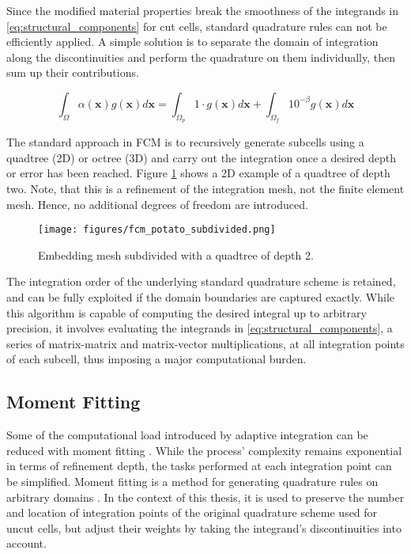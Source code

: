 Since the modified material properties break the smoothness of the integrands in \ref{eq:structural_components} for cut cells, standard quadrature rules can not be efficiently applied. A simple solution is to separate the domain of integration along the discontinuities and perform the quadrature on them individually, then sum up their contributions.

\begin{equation}
	\int_{\Omega} \alpha (\mathbf x) g(\mathbf x) d\mathbf x=
	\int_{\Omega_p} 1 \cdot g(\mathbf x) d\mathbf x
	+
	\int_{\Omega_f} 10^{-\beta} g(\mathbf x) d\mathbf x
\end{equation}

 The standard approach in FCM is to recursively generate subcells using a quadtree (2D) or octree (3D) and carry out the integration once a desired depth or error has been reached. Figure \ref{fig:fcm_potato_partitioned} shows a 2D example of a quadtree of depth two. Note, that this is a refinement of the integration mesh, not the finite element mesh. Hence, no additional degrees of freedom are introduced.

\begin{figure}[h]
	\centering
	\texttt{[image: figures/fcm\_potato\_subdivided.png]}
	\caption{Embedding mesh subdivided with a quadtree of depth 2.}
	\label{fig:fcm_potato_partitioned}
\end{figure}

The integration order of the underlying standard quadrature scheme is retained, and can be fully exploited if the domain boundaries are captured exactly. While this algorithm is capable of computing the desired integral up to arbitrary precision, it involves evaluating the integrands in \ref{eq:structural_components}, a series of matrix-matrix and matrix-vector multiplications, at all integration points of each subcell, thus imposing a major computational burden.

\subsection{Moment Fitting}
\label{subsection:moment_fitting}

Some of the computational load introduced by adaptive integration can be reduced
with moment fitting \cite{Joulaian2015}. While the process' complexity remains exponential in terms of refinement depth, the tasks performed at each integration point can be simplified. Moment fitting is a method for generating quadrature rules on arbitrary domains \cite{Muller2013}. In the context of this thesis, it is used to preserve the number and location of integration points of the original quadrature scheme used for uncut cells, but adjust their weights by taking the integrand's discontinuities into account.

